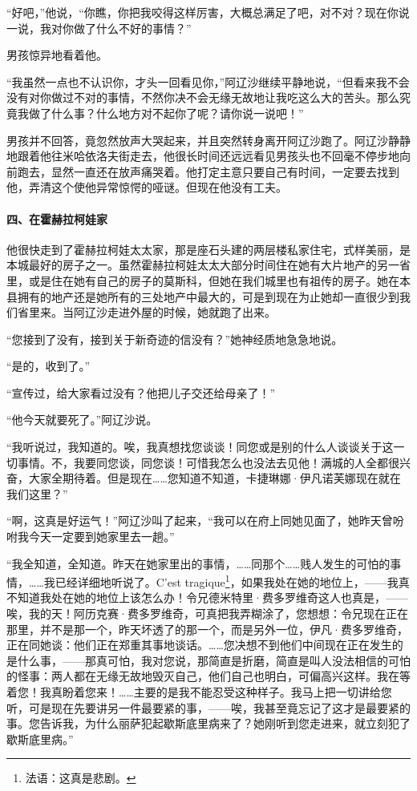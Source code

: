 \par “好吧，”他说，“你瞧，你把我咬得这样厉害，大概总满足了吧，对不对？现在你说一说，我对你做了什么不好的事情？”
\par 男孩惊异地看着他。
\par “我虽然一点也不认识你，才头一回看见你，”阿辽沙继续平静地说，“但看来我不会没有对你做过不对的事情，不然你决不会无缘无故地让我吃这么大的苦头。那么究竟我做了什么事？什么地方对不起你了呢？请你说一说吧！”
\par 男孩并不回答，竟忽然放声大哭起来，并且突然转身离开阿辽沙跑了。阿辽沙静静地跟着他往米哈依洛夫街走去，他很长时间还远远看见男孩头也不回毫不停步地向前跑去，显然一直还在放声痛哭着。他打定主意只要自己有时间，一定要去找到他，弄清这个使他异常惊愕的哑谜。但现在他没有工夫。
\paragraph*{四、在霍赫拉柯娃家}
\par 他很快走到了霍赫拉柯娃太太家，那是座石头建的两层楼私家住宅，式样美丽，是本城最好的房子之一。虽然霍赫拉柯娃太太大部分时间住在她有大片地产的另一省里，或是住在她有自己的房子的莫斯科，但她在我们城里也有祖传的房子。她在本县拥有的地产还是她所有的三处地产中最大的，可是到现在为止她却一直很少到我们省里来。当阿辽沙走进外屋的时候，她就跑了出来。
\par “您接到了没有，接到关于新奇迹的信没有？”她神经质地急急地说。
\par “是的，收到了。”
\par “宣传过，给大家看过没有？他把儿子交还给母亲了！”
\par “他今天就要死了。”阿辽沙说。
\par “我听说过，我知道的。唉，我真想找您谈谈！同您或是别的什么人谈谈关于这一切事情。不，我要同您谈，同您谈！可惜我怎么也没法去见他！满城的人全都很兴奋，大家全期待着。但是现在……您知道不知道，卡捷琳娜·伊凡诺芙娜现在就在我们这里？”
\par “啊，这真是好运气！”阿辽沙叫了起来，“我可以在府上同她见面了，她昨天曾吩咐我今天一定要到她家里去一趟。”
\par “我全知道，全知道。昨天在她家里出的事情，……同那个……贱人发生的可怕的事情，……我已经详细地听说了。C’est tragique\footnote{法语：这真是悲剧。}，如果我处在她的地位上，——我真不知道我处在她的地位上该怎么办！令兄德米特里·费多罗维奇这人也真是，——唉，我的天！阿历克赛·费多罗维奇，可真把我弄糊涂了，您想想：令兄现在正在那里，并不是那一个，昨天坏透了的那一个，而是另外一位，伊凡·费多罗维奇，正在同她谈：他们正在郑重其事地谈话。……您决想不到他们中间现在正在发生的是什么事，——那真可怕，我对您说，那简直是折磨，简直是叫人没法相信的可怕的怪事：两人都在无缘无故地毁灭自己，他们自己也明白，可偏高兴这样。我在等着您！我真盼着您来！……主要的是我不能忍受这种样子。我马上把一切讲给您听，可是现在先要讲另一件最要紧的事，——唉，我甚至竟忘记了这才是最要紧的事。您告诉我，为什么丽萨犯起歇斯底里病来了？她刚听到您走进来，就立刻犯了歇斯底里病。”
